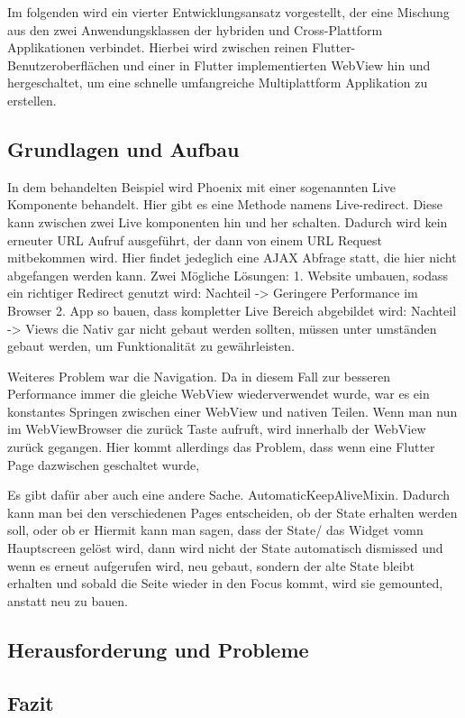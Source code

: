 Im folgenden wird ein vierter Entwicklungsansatz vorgestellt, der eine Mischung aus den zwei Anwendungsklassen der hybriden und Cross-Plattform Applikationen verbindet. Hierbei wird zwischen reinen Flutter-Benutzeroberflächen und einer in Flutter implementierten WebView hin und hergeschaltet, um eine schnelle umfangreiche Multiplattform Applikation zu erstellen.

\subsection{Grundlagen und Aufbau}
In dem behandelten Beispiel wird Phoenix mit einer sogenannten Live Komponente behandelt. Hier gibt es eine Methode namens Live-redirect. Diese kann zwischen zwei Live komponenten hin und her schalten. Dadurch wird kein erneuter URL Aufruf ausgeführt, der dann von einem URL Request mitbekommen wird. Hier findet jedeglich eine AJAX Abfrage statt, die hier nicht abgefangen werden kann.
Zwei Mögliche Lösungen:
1. Website umbauen, sodass ein richtiger Redirect genutzt wird: Nachteil -> Geringere Performance im Browser
2. App so bauen, dass kompletter Live Bereich abgebildet wird: Nachteil -> Views die Nativ gar nicht gebaut werden sollten, müssen unter umständen gebaut werden, um Funktionalität zu gewährleisten.

Weiteres Problem war die Navigation. Da in diesem Fall zur besseren Performance immer die gleiche WebView wiederverwendet wurde, war es ein konstantes Springen zwischen einer WebView und nativen Teilen. Wenn man nun im WebViewBrowser die zurück Taste aufruft, wird innerhalb der WebView zurück gegangen. Hier kommt allerdings das Problem, dass wenn eine Flutter Page dazwischen geschaltet wurde, 

Es gibt dafür aber auch eine andere Sache. AutomaticKeepAliveMixin.
Dadurch kann man bei den verschiedenen Pages entscheiden, ob der State erhalten werden soll, oder ob er 
Hiermit kann man sagen, dass der State/ das Widget vomn Hauptscreen gelöst wird, dann wird nicht der State automatisch dismissed und wenn es erneut aufgerufen wird, neu gebaut, sondern der alte State bleibt erhalten und sobald die Seite wieder in den Focus kommt, wird sie gemounted, anstatt neu zu bauen.

\subsection{Herausforderung und Probleme}

\subsection{Fazit}